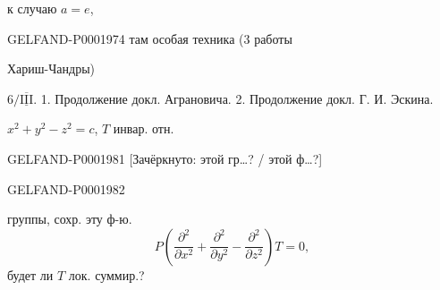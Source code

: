 к случаю $a=e$,



\begin{GelfandAdjacentEvidence}{GELFAND-P000197}{4}
там особая техника (3 работы



\end{GelfandAdjacentEvidence}

Хариш-Чандры)





\par\noindent\begin{minipage}{\linewidth}
$6/\overline{\underline{\mathrm{III}}}$. 
1. Продолжение докл. Аграновича.
2. Продолжение докл. Г. И. Эскина.



\begin{center}\end{center}



$x^2+y^2-z^2=c$, $T$ инвар. отн.



\begin{GelfandAdjacentEvidence}{GELFAND-P000198}{1}
[Зачёркнуто: этой гр…? / этой ф…?]
\end{GelfandAdjacentEvidence}
\end{minipage}\par

\begin{GelfandAdjacentEvidence}{GELFAND-P000198}{2}

группы, сохр. эту ф-ю.
\begin{equation*}
P\left(\frac{\partial^2}{\partial x^2}+\frac{\partial^2}{\partial y^2}-\frac{\partial^2}{\partial z^2}\right)T=0,
\end{equation*}
будет ли $T$ лок. суммир.?



\end{GelfandAdjacentEvidence}

